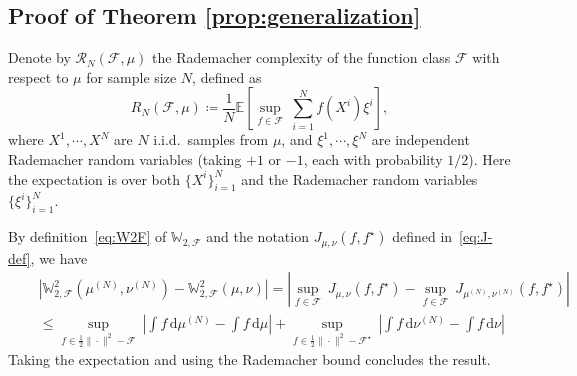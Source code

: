\documentclass[10pt]{article}
\newcommand{\Expect}{\mathbb{E}}
\newcommand{\ud}{\,\mathrm{d}}
\newcommand{\norm}[1]{\|#1\|}
\newcommand{\W}{\mathds{W}}
\newcommand{\calF}{\mathcal{F}}
\numberwithin{equation}{section}
\begin{document}
\subsection{Proof of Theorem \ref{prop:generalization}}\label{apdx:prop-generalization}
Denote by $\mathcal{R}_N(\calF,\mu)$ the Rademacher complexity of the function class $\calF$ with respect to $\mu$ for sample size $N$, defined as
\begin{equation*}
R_N(\calF,\mu) \coloneqq \frac{1}{N} \Expect \left[\sup_{f \in \calF}~\sum_{i=1}^N f(X^i)\xi^i \right],
\end{equation*}
where $X^1,\cdots,X^N$ are $N$ i.i.d.~samples from $\mu$, and $\xi^1,\cdots,\xi^N$ are independent Rademacher random variables (taking $+1$ or $-1$, each with probability $1/2$). Here the expectation is over both $\{X^i\}_{i=1}^N$ and the Rademacher random variables $\{\xi^i\}_{i=1}^N$. 

By definition~\eqref{eq:W2F} of $\W_{2,\calF}$ and the notation $J_{\mu,\nu}(f,f^\star)$ defined in~\eqref{eq:J-def}, we have
\begin{align*}
&\left|\W_{2,\calF}^2(\mu^{(N)},\nu^{(N)}) - \W^2_{2,\calF}(\mu,\nu)\right| = \left| \sup_{f\in \calF}~{J}_{\mu,\nu}(f,f^\star) - \sup_{f\in\calF}~{J}_{\mu^{(N)},\nu^{(N)}}(f,f^\star) \right|\\
\quad &\leq \sup_{f\in \frac{1}{2}\norm{\cdot}^2-\calF}~\left|\int f \ud \mu^{(N)} - \int f \ud \mu\right| + \sup_{f\in \frac{1}{2}\norm{\cdot}^2-\calF^\star}~\left|\int f \ud \nu^{(N)} - \int f \ud \nu\right|
\end{align*}
Taking the expectation and using the Rademacher bound concludes the result. 
\end{document}
